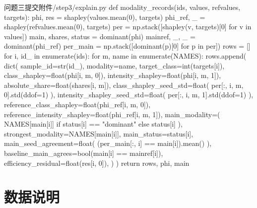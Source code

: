 \begin{appendices}
\begin{Python}{问题三提交附件/step3/explain.py}
def modality_records(ids, values, refvalues, targets):
    phi, res = shapley(values.mean(0), targets)
    phi_ref, _ = shapley(refvalues.mean(0), targets)
    per = np.stack([shapley(v, targets)[0] for v in values])
    main, shares, status = dominant(phi)
    mainref, _, _ = dominant(phi_ref)
    per_main = np.stack([dominant(p)[0] for p in per])
    rows = []
    for i, id_ in enumerate(ids):
        for m, name in enumerate(NAMES):
            rows.append(
                dict(
                    sample_id=str(id_),
                    modality=name,
                    target_class=int(targets[i]),
                    class_shapley=float(phi[i, m, 0]),
                    intensity_shapley=float(phi[i, m, 1]),
                    absolute_share=float(shares[i, m]),
                    class_shapley_seed_std=float(
                        per[:, i, m, 0].std(ddof=1)
                    ),
                    intensity_shapley_seed_std=float(
                        per[:, i, m, 1].std(ddof=1)
                    ),
                    reference_class_shapley=float(phi_ref[i, m, 0]),
                    reference_intensity_shapley=float(phi_ref[i, m, 1]),
                    main_modality=(
                        NAMES[main[i]]
                        if status[i] == "dominant"
                        else status[i]
                    ),
                    strongest_modality=NAMES[main[i]],
                    main_status=status[i],
                    main_seed_agreement=float(
                        (per_main[:, i] == main[i]).mean()
                    ),
                    baseline_main_agrees=bool(main[i] == mainref[i]),
                    efficiency_residual=float(res[i, 0]),
                )
            )
    return rows, phi, main
\end{Python}

\vspace{2ex}

\clearpage
\section{数据说明}
\label{app:tail-materials}


\end{appendices}
